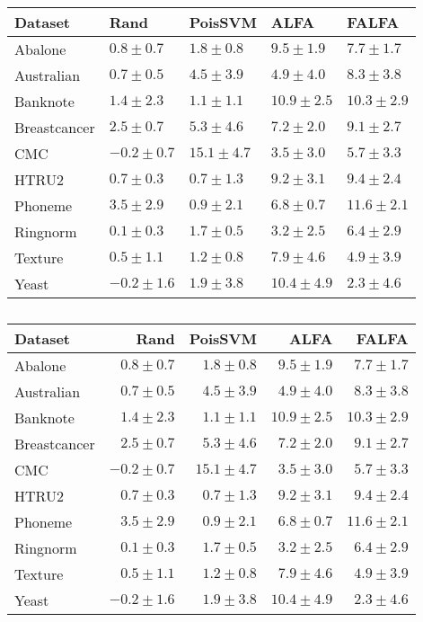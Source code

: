 \begin{tabular}{lllll}
    \toprule
         Dataset &         Rand &      PoisSVM &         ALFA &        FALFA \\
    \midrule
         Abalone &  $0.8\pm0.7$ &  $1.8\pm0.8$ &  $9.5\pm1.9$ &  $7.7\pm1.7$ \\
      Australian &  $0.7\pm0.5$ &  $4.5\pm3.9$ &  $4.9\pm4.0$ &  $8.3\pm3.8$ \\
        Banknote &  $1.4\pm2.3$ &  $1.1\pm1.1$ & $10.9\pm2.5$ & $10.3\pm2.9$ \\
    Breastcancer &  $2.5\pm0.7$ &  $5.3\pm4.6$ &  $7.2\pm2.0$ &  $9.1\pm2.7$ \\
             CMC & $-0.2\pm0.7$ & $15.1\pm4.7$ &  $3.5\pm3.0$ &  $5.7\pm3.3$ \\
           HTRU2 &  $0.7\pm0.3$ &  $0.7\pm1.3$ &  $9.2\pm3.1$ &  $9.4\pm2.4$ \\
         Phoneme &  $3.5\pm2.9$ &  $0.9\pm2.1$ &  $6.8\pm0.7$ & $11.6\pm2.1$ \\
        Ringnorm &  $0.1\pm0.3$ &  $1.7\pm0.5$ &  $3.2\pm2.5$ &  $6.4\pm2.9$ \\
         Texture &  $0.5\pm1.1$ &  $1.2\pm0.8$ &  $7.9\pm4.6$ &  $4.9\pm3.9$ \\
           Yeast & $-0.2\pm1.6$ &  $1.9\pm3.8$ & $10.4\pm4.9$ &  $2.3\pm4.6$ \\
    \bottomrule
\end{tabular}


\begin{table}
    \footnotesize
    \centering
    \caption{}
    \begin{tabular}{l|r|r|r|r}
        \toprule
             Dataset &         Rand &      PoisSVM &         ALFA &        FALFA \\
        \midrule
             Abalone &  $0.8\pm0.7$ &  $1.8\pm0.8$ &  $9.5\pm1.9$ &  $7.7\pm1.7$ \\
          Australian &  $0.7\pm0.5$ &  $4.5\pm3.9$ &  $4.9\pm4.0$ &  $8.3\pm3.8$ \\
            Banknote &  $1.4\pm2.3$ &  $1.1\pm1.1$ & $10.9\pm2.5$ & $10.3\pm2.9$ \\
        Breastcancer &  $2.5\pm0.7$ &  $5.3\pm4.6$ &  $7.2\pm2.0$ &  $9.1\pm2.7$ \\
                 CMC & $-0.2\pm0.7$ & $15.1\pm4.7$ &  $3.5\pm3.0$ &  $5.7\pm3.3$ \\
               HTRU2 &  $0.7\pm0.3$ &  $0.7\pm1.3$ &  $9.2\pm3.1$ &  $9.4\pm2.4$ \\
             Phoneme &  $3.5\pm2.9$ &  $0.9\pm2.1$ &  $6.8\pm0.7$ & $11.6\pm2.1$ \\
            Ringnorm &  $0.1\pm0.3$ &  $1.7\pm0.5$ &  $3.2\pm2.5$ &  $6.4\pm2.9$ \\
             Texture &  $0.5\pm1.1$ &  $1.2\pm0.8$ &  $7.9\pm4.6$ &  $4.9\pm3.9$ \\
               Yeast & $-0.2\pm1.6$ &  $1.9\pm3.8$ & $10.4\pm4.9$ &  $2.3\pm4.6$ \\
        \bottomrule
    \end{tabular}
    \label{}
\end{table}


